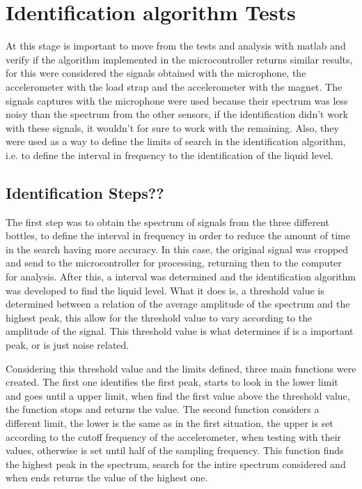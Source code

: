 \section{Identification algorithm Tests}
At this stage is important to move from the tests and analysis with \acrshort{matlab} and verify if the algorithm implemented in the microcontroller returns similar results, for this were considered the signals obtained with the microphone, the accelerometer with the load strap and the accelerometer with the magnet. The signals captures with the microphone were used because their spectrum was less noisy than the spectrum from the other sensors, if the identification didn't work with these signals, it wouldn't for sure to work with the remaining. Also, they were used as a way to define the limits of search in the identification algorithm, i.e. to define the interval in frequency to the identification of the liquid level.  
\subsection{Identification Steps??}
The first step was to obtain the spectrum of signals from the three different bottles, to define the interval in frequency in order to reduce the amount of time in the search having more accuracy. In this case, the original signal was cropped and send to the microcontroller for processing, returning then to the computer for analysis.
After this, a interval was determined and the identification algorithm was developed to find the liquid level. What it does is, a threshold value is determined between a relation of the average amplitude of the spectrum and the highest peak, this allow for the threshold value to vary according to the amplitude of the signal. This threshold value is what determines if is a important peak, or is just noise related. 

Considering this threshold value and the limits defined, three main functions were created. The first one identifies the first peak, starts to look in the lower limit and goes until a upper limit, when find the first value above the threshold value, the function stops and returns the value.
The second function considers a different limit, the lower is the same as in the first situation, the upper is set according to the cutoff frequency of the accelerometer, when testing with their values, otherwise is set until half of the sampling frequency. This function finds the highest peak in the spectrum, search for the intire spectrum considered and when ends returns the value of the highest one.

